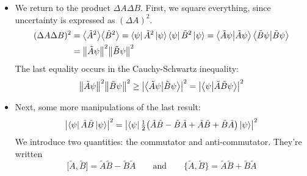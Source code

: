 \documentclass[11pt, a4paper]{article}
\newcommand{\eqtext}[1]{\qquad \text{#1} \qquad}
\begin{document}
\begin{itemize}
	\item We return to the product $ \Delta A \Delta B $. First, we square everything, since uncertainty is expressed as $ (\Delta A)^{2} $. 
	\begin{align*}
		(\Delta A \Delta B)^{2} &= \big\langle \tilde{A}^{2} \big\rangle \big\langle \tilde{B}^{2} \big\rangle = \bra{\psi}\tilde{A}^{2}\ket{\psi} \bra{\psi}\tilde{B}^{2}\ket{\psi} = \braket{\tilde{A}\psi}{\tilde{A}\psi}\braket{\tilde{B}\psi}{\tilde{B}\psi}\\
		&= \norm{\tilde{A}\psi}^{2}\norm{\tilde{B}\psi}^{2}
	\end{align*}
	The last equality occurs in the Cauchy-Schwartz inequality:
	\begin{equation*}
		\norm{\tilde{A}\psi}^{2}\norm{\tilde{B}\psi}^{2} \geq \abs{\braket{\tilde{A}\psi}{\tilde{B}\psi}}^{2} = \abs{\braket{\psi}{\tilde{A}\tilde{B}\psi}}^{2}
	\end{equation*}
	
	\item Next, some more manipulations of the last result:
	\begin{equation*}
		 \abs{\bra{\psi}\tilde{A}\tilde{B}\ket{\psi}}^{2} = \abs{\bra{\psi}\tfrac{1}{2}\big(\tilde{A}\tilde{B} - \tilde{B}\tilde{A} + \tilde{A}\tilde{B} + \tilde{B}\tilde{A}\big)\ket{\psi} }^{2}
	\end{equation*}
	We introduce two quantities: the commutator and anti-commutator. They're written
	\begin{equation*}
		\big[\tilde{A}, \tilde{B}\big] = \tilde{A}\tilde{B} - \tilde{B}\tilde{A} \eqtext{and} \big\{\tilde{A}, \tilde{B}\big\} = \tilde{A}\tilde{B} + \tilde{B}\tilde{A}
	\end{equation*} 
\end{itemize}
\end{document}
